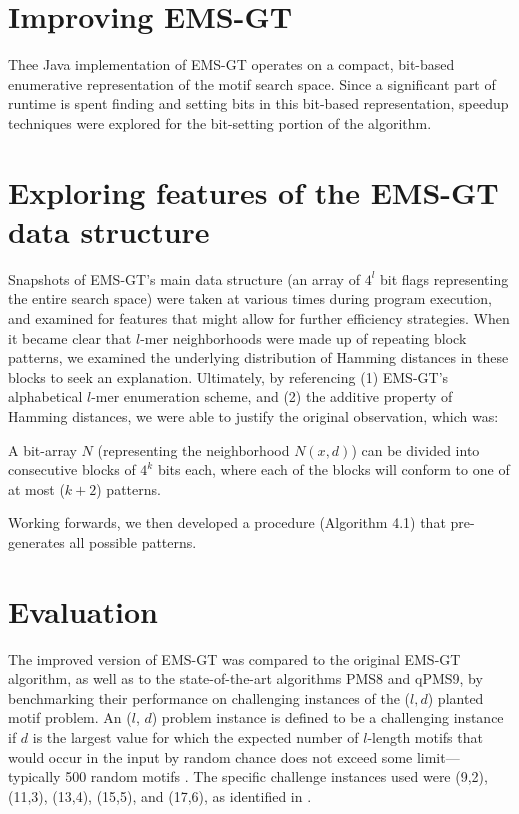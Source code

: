 \documentclass[oneside,12pt]{DISCSthesis}
\begin{document}
{	\section{Improving EMS-GT}
		Thee Java implementation of EMS-GT operates on a compact, bit-based enumerative representation of the motif search space. Since a significant part of runtime is spent finding and setting bits in this bit-based representation, speedup techniques were explored for the bit-setting portion of the algorithm.

		\section{Exploring features of the EMS-GT data structure}
			Snapshots of EMS-GT's main data structure (an array of $4^l$ bit flags representing the entire search space) were taken at various times during program execution, and examined for features that might allow for further efficiency strategies. When it became clear that $l$-mer neighborhoods were made up of repeating block patterns, we examined the underlying distribution of Hamming distances in these blocks to seek an explanation. Ultimately, by referencing (1) EMS-GT's alphabetical $l$-mer enumeration scheme, and (2) the additive property of Hamming distances, we were able to justify the original observation, which was:

			A bit-array $N$ (representing the neighborhood $N(x,d)$)
				can be divided into consecutive blocks of $4^k$ bits each, where
				each of the blocks will conform to one of at most ($k+2$) patterns.

			Working forwards, we then developed a procedure (Algorithm 4.1) that pre-generates all possible patterns. 


	\section{Evaluation}
		The improved version of EMS-GT was compared to the original EMS-GT algorithm, as well as to the state-of-the-art algorithms PMS8 and qPMS9, by benchmarking their performance on challenging instances of the ($l, d$) planted motif problem. An ($l$, $d$) problem instance is defined to be a challenging instance if $d$ is the largest value for which the expected number of $l$-length motifs that would occur in the input by random chance does not exceed some limit---typically 500 random motifs \cite{pms2015}. The specific challenge instances used were (9,2), (11,3), (13,4), (15,5), and (17,6), as identified in \cite{pms2015,pms2007}. 
		\bigskip

}
\end{document}

